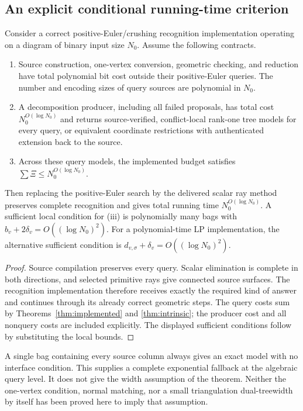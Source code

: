 \subsection{An explicit conditional running-time criterion}

\begin{theorem}
\label{thm:recognition}
Consider a correct positive-Euler/crushing recognition implementation operating
on a diagram of binary input size $N_0$. Assume the following contracts.
\begin{enumerate}[label=(\roman*),leftmargin=2em]
\item Source construction, one-vertex conversion, geometric checking, and
reduction have total polynomial bit cost outside their positive-Euler queries.
The number and encoding sizes of query sources are polynomial in $N_0$.
\item A decomposition producer, including all failed proposals, has total cost
$N_0^{O(\log N_0)}$ and returns source-verified, conflict-local rank-one tree
models for every query, or equivalent coordinate restrictions with authenticated
extension back to the source.
\item Across these query models, the implemented budget satisfies
$\sum\Xi\leq N_0^{O(\log N_0)}$.
\end{enumerate}
Then replacing the positive-Euler search by the delivered scalar ray method
preserves complete recognition and gives total running time
$N_0^{O(\log N_0)}$. A sufficient local condition for (iii) is polynomially many
bags with $b_v+2\delta_v=O((\log N_0)^2)$. For a polynomial-time LP implementation,
the alternative sufficient condition is
$d_{v,\sigma}+\delta_v=O((\log N_0)^2)$.
\end{theorem}

\begin{proof}
Source compilation preserves every query. Scalar elimination is complete in
both directions, and selected primitive rays give connected source surfaces.
The recognition implementation therefore receives exactly the required kind
of answer and continues through its already correct geometric steps. The
query costs sum by Theorems~\ref{thm:implemented} and \ref{thm:intrinsic}; the
producer cost and all nonquery costs are included explicitly. The displayed
sufficient conditions follow by substituting the local bounds.
\end{proof}

A single bag containing every source column always gives an exact model with
no interface condition. This supplies a complete exponential fallback at the
algebraic query level. It does not give the width assumption of the theorem.
Neither the one-vertex condition, normal matching, nor a small triangulation
dual-treewidth by itself has been proved here to imply that assumption.

